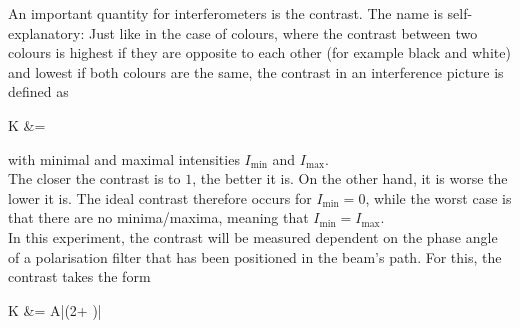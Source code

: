 An important quantity for interferometers is the contrast. The name is self-explanatory: Just like in the case of colours, where the contrast between two colours is highest if they are opposite to each other (for example black and white) and lowest if both colours are the same, the contrast in an interference picture is defined as 
\begin{aquation}
  K &=  \tc
  \label{eq:contrast}
\end{aquation}
with minimal and maximal intensities $I_\text{min}$ and $I_\text{max}$.\\
The closer the contrast is to $1$, the better it is. On the other hand, it is worse the lower it is. The ideal contrast therefore occurs for $I_\text{min}=0$, while the worst case is that there are no minima/maxima, meaning that $I_\text{min}=I_\text{max}$.\\
In this experiment, the contrast will be measured dependent on the phase angle of a polarisation filter that has been positioned in the beam's path. For this, the contrast takes the form 
\begin{aquation}
K &= A|\sin(2\varphi + \delta)| \tp
\end{aquation}

